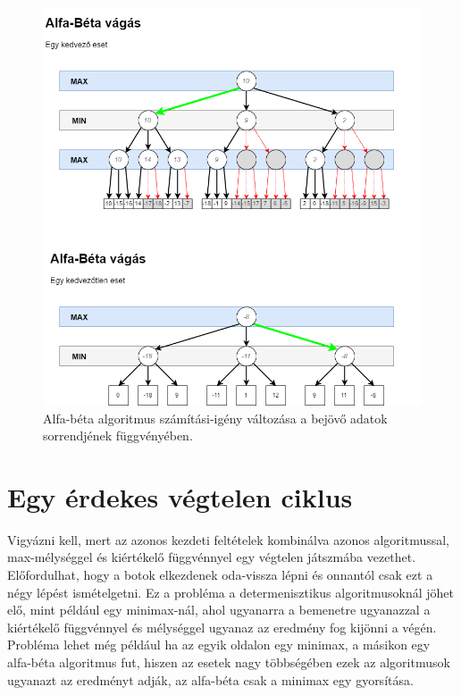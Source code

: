 \documentclass[twoside, a4paper, 12pt]{book}
\begin{document}
\begin{figure}[htbp]
	\centering
	\includegraphics[width=\textwidth]{img/alphabeta_examples.png}
	\caption{Alfa-béta algoritmus számítási-igény változása a bejövő adatok sorrendjének függvényében.}
	\label{fig:alphabeta_examples}
\end{figure}

\section{Egy érdekes végtelen ciklus}
Vigyázni kell, mert az azonos kezdeti feltételek kombinálva azonos algoritmussal, max-mélységgel és kiértékelő függvénnyel egy végtelen játszmába vezethet. Előfordulhat, hogy a botok elkezdenek oda-vissza lépni és onnantól csak ezt a négy lépést ismételgetni. Ez a probléma a determenisztikus algoritmusoknál jöhet elő, mint például egy minimax-nál, ahol ugyanarra a bemenetre ugyanazzal a kiértékelő függvénnyel és mélységgel ugyanaz az eredmény fog kijönni a végén. Probléma lehet még például ha az egyik oldalon egy minimax, a másikon egy alfa-béta algoritmus fut, hiszen az esetek nagy többségében ezek az algoritmusok ugyanazt az eredményt adják, az alfa-béta csak a minimax egy gyorsítása.
\end{document}
